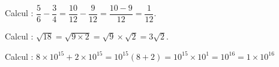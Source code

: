 
% 
%
 
Calcul : %
$\dfrac{5}{6} - \dfrac{3}{4} = \dfrac{10}{12} - \dfrac{9}{12} =  \dfrac{10 - 9}{12} = \dfrac{1}{12}$.

\smallskip

Calcul  : %
$\sqrt{18} = \sqrt{9 \times 2} = \sqrt{9} \times \sqrt{2} = 3\sqrt{2}$.
\smallskip
 
Calcul  : %
$8 \times 10^{15} + 2 \times 10^{15} =  10^{15}(8 + 2) = 10^{15} \times 10^1  = 10^{16} = 1 \times 10^{16}$
\bigskip
 
